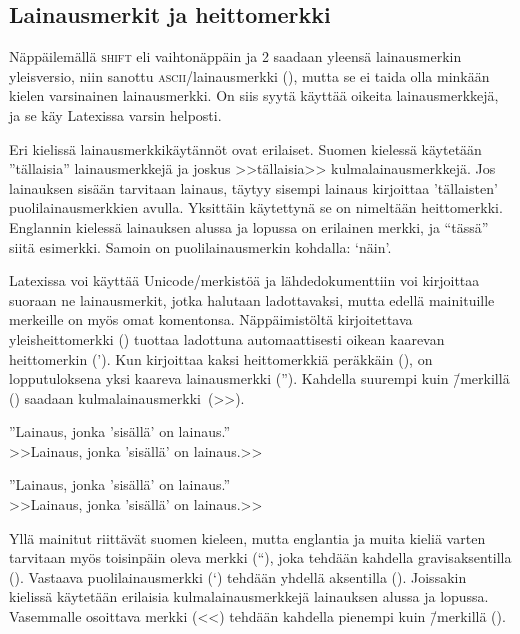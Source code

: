 \subsection{Lainausmerkit ja heittomerkki}
\label{luku:lainausmerkit}

Näppäilemällä \textsc{shift} eli vaihtonäppäin ja 2 saadaan yleensä
lainausmerkin yleisversio, niin sanottu \textsc{ascii}\-/lainausmerkki
(\textquotedbl), mutta se ei taida olla minkään kielen varsinainen
lainausmerkki. On siis syytä käyttää oikeita lainausmerkkejä, ja se käy
Latexissa varsin helposti.

Eri kielissä lainausmerkkikäytännöt ovat erilaiset. Suomen kielessä
käytetään ''tällaisia'' lainausmerkkejä ja joskus >>tällaisia>>
kulmalainausmerkkejä. Jos lainauksen sisään tarvitaan lainaus, täytyy
sisempi lainaus kirjoittaa 'tällaisten' puolilainausmerkkien avulla.
Yksittäin käytettynä se on nimeltään heittomerkki. Englannin kielessä
lainauksen alussa ja lopussa on erilainen merkki, ja ``tässä'' siitä
esimerkki. Samoin on puolilainausmerkin kohdalla: `näin'.

Latexissa voi käyttää Unicode\-/merkistöä ja lähdedokumenttiin voi
kirjoittaa suoraan ne lainausmerkit, jotka halutaan ladottavaksi, mutta
edellä mainituille merkeille on myös omat komentonsa. Näppäimistöltä
kirjoitettava yleisheittomerkki () tuottaa ladottuna
automaattisesti oikean kaarevan heittomerkin ('). Kun kirjoittaa kaksi
heittomerkkiä peräkkäin (), on lopputuloksena yksi kaareva
lainausmerkki (''). Kahdella suurempi kuin \=/merkillä (\koodi{>>})
saadaan kulmalainausmerkki~(>>).

\pagebreak[3]

\begin{koodilohkosis}
  ''Lainaus, jonka 'sisällä' on lainaus.'' \\
  >>Lainaus, jonka 'sisällä' on lainaus.>>
\end{koodilohkosis}

\begin{tulossis}
  ''Lainaus, jonka 'sisällä' on lainaus.'' \\
  >>Lainaus, jonka 'sisällä' on lainaus.>>
\end{tulossis}

Yllä mainitut riittävät suomen kieleen, mutta englantia ja muita kieliä
varten tarvitaan myös toisinpäin oleva merkki (``), joka tehdään
kahdella gra\-vis\-ak\-sen\-til\-la (). Vastaava
puolilainausmerkki (`) tehdään yhdellä aksentilla (). Joissakin
kielissä käytetään erilaisia kulmalainausmerkkejä lainauksen alussa ja
lopussa. Vasemmalle osoittava merkki (<<) tehdään kahdella pienempi kuin
\=/merkillä (\koodi{<<}).

